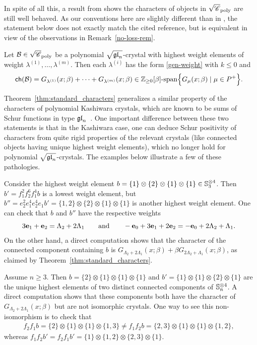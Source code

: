 \documentclass[11pt]{article}
\begin{document}
In spite of all this, a result from \cite{MTY} shows the characters of objects in  $\sqrt{\mathscr{C}}_{\operatorname{poly}}$ are still well behaved.
As our conventions here are slightly different than in \cite{MTY}, the statement below does not exactly match the cited reference, but is equivalent in view of the observations in Remark~\ref{no-loss-rem}.

\begin{theorem}
\label{thm:standard_characters}
Let $\mathcal{B} \in \sqrt{\mathscr{C}}_{\operatorname{poly}}$ be a polynomial $\sqrt{\mathfrak{gl}_n}$-crystal with highest weight elements of weight $\lambda^{(1)}, \dotsc, \lambda^{(m)}$.
Then each $\lambda^{(i)}$ has the form \eqref{gen-weight} with $k\leq 0$ and
\[
\mathsf{ch}(\mathcal{B}) =  G_{\lambda^{(1)}}(x; \beta) + \cdots + G_{\lambda^{(m)}}(x; \beta) \in \mathbb{Z}_{\geq 0}[\beta]\textnormal{-span}\Bigl\{ G_{\mu}(x; \beta)  \mid \mu \in P^+\Bigr\}.
\]
\end{theorem}

Theorem~\ref{thm:standard_characters} generalizes a similar property of the characters of polynomial Kashiwara crystals, which are known to be sums of Schur functions in type $\mathfrak{gl}_n$~\cite{KN94}.
One important difference between these two statements is that in the Kashiwara case, one can deduce Schur positivity of characters from quite rigid properties of the relevant crystals (like connected objects having unique highest weight elements), which no longer hold for polynomial $\sqrt{\mathfrak{gl}_n}$-crystals.
The examples below illustrate a few of these pathologies.

\begin{example}
\label{ex:weight_not_isomorphism}
Consider the highest weight element $b = \{1\} \otimes \{2\} \otimes \{1\} \otimes \{1\} \in \mathbb{S}_3^{\otimes 4}$.
Then $b' = f_1^2 f_2^6 f_1^4 b$ is a lowest weight element, but
$
b'' = e_2^2 e_1^4 e_2^4 e_1 b' = \{1,2\} \otimes \{2\} \otimes \{1\} \otimes \{1\}
$
is another highest weight element.
One can check that $b$ and $b''$ have the respective weights 
\[
3\textbf{e}_1 + \textbf{e}_2 = \Lambda_2 + 2\Lambda_1
\qquad\text{and}\qquad
-\textbf{e}_0 + 3\textbf{e}_1 + 2\textbf{e}_2=-\textbf{e}_0+ 2\Lambda_2 + \Lambda_1.
\]
On the other hand, a direct computation shows that the character of the connected component containing $b$ is $G_{\Lambda_2 + 2\Lambda_1}(x; \beta) + \beta G_{2\Lambda_2 + \Lambda_1}(x; \beta)$, as claimed by Theorem~\ref{thm:standard_characters}.
\end{example}

\begin{example}
Assume $n\geq 3$. Then  
$
b = \{2\} \otimes \{1\} \otimes \{1\} \otimes \{1\}
$
and
$
b' = \{1\} \otimes \{1\} \otimes \{2\} \otimes \{1\}
$
are the unique highest elements of two distinct connected components of $\mathbb{S}_n^{\otimes 4}$.
A direct computation shows that these components both have the character of $G_{\Lambda_2+2\Lambda_1}(x; \beta)$ but are not isomorphic crystals.
One way to see this non-isomorphism is to check that
\begin{gather*}
f_2 f_1 b = \{2\} \otimes \{1\} \otimes \{1\} \otimes \{1,3\}
\neq 
f_1 f_2 b = \{2,3\} \otimes \{1\} \otimes \{1\} \otimes \{1,2\},
\end{gather*}
whereas
$
f_1 f_2 b' = f_2 f_1 b' = \{1\} \otimes \{1,2\} \otimes \{2,3\} \otimes \{1\}.
$
\end{example}
\end{document}
